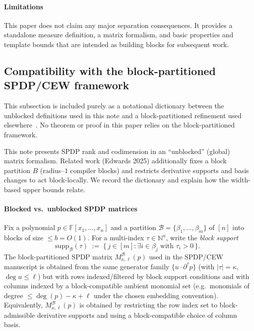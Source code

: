 \documentclass[12pt]{article}
\theoremstyle{definition}
\theoremstyle{remark}
\begin{document}
\paragraph{Limitations}
This paper does not claim any major separation consequences. It provides a
standalone measure definition, a matrix formalism, and basic properties and
template bounds that are intended as building blocks for subsequent work.

\subsection{Compatibility with the block-partitioned SPDP/CEW framework}
\label{subsec:compat-spdp-cew}

This subsection is included purely as a notational dictionary between the unblocked
definitions used in this note and a block-partitioned refinement used elsewhere~\citep{Edwards2025}.
No theorem or proof in this paper relies on the block-partitioned framework.

This note presents SPDP rank and codimension in an ``unblocked'' (global) matrix
formalism. Related work (Edwards 2025) additionally fixes a block partition $B$
(radius--$1$ compiler blocks) and restricts derivative supports and basis changes to act
block-locally. We record the dictionary and explain how the width-based upper bounds relate.

\paragraph{Blocked vs.\ unblocked SPDP matrices}
Fix a polynomial $p \in \mathbb{F}[x_1,\dots,x_n]$ and a partition
$\mathcal{B}=\{\beta_1,\dots,\beta_m\}$ of $[n]$ into blocks of size $\le b=O(1)$.
For a multi-index $\tau\in\mathbb{N}^n$, write the \emph{block support}
\[
  \mathrm{supp}_{\mathcal{B}}(\tau)
  \;:=\;
  \{\, j \in [m] : \exists i\in \beta_j \text{ with } \tau_i>0 \,\}.
\]
The block-partitioned SPDP matrix $M^{\mathcal{B}}_{\kappa,\ell}(p)$ used in the
SPDP/CEW manuscript \citep{Edwards2025} is obtained from the same generator family
$\{u\cdot \partial^\tau p\}$ (with $|\tau|=\kappa$, $\deg u\le \ell$) but with rows
indexed/filtered by block support conditions and with columns indexed by a
block-compatible ambient monomial set (e.g.\ monomials of degree
$\le \deg(p)-\kappa+\ell$ under the chosen embedding convention).
Equivalently, $M^{\mathcal{B}}_{\kappa,\ell}(p)$ is obtained by restricting the row
index set to block-admissible derivative supports and using a block-compatible
choice of column basis.
\end{document}
